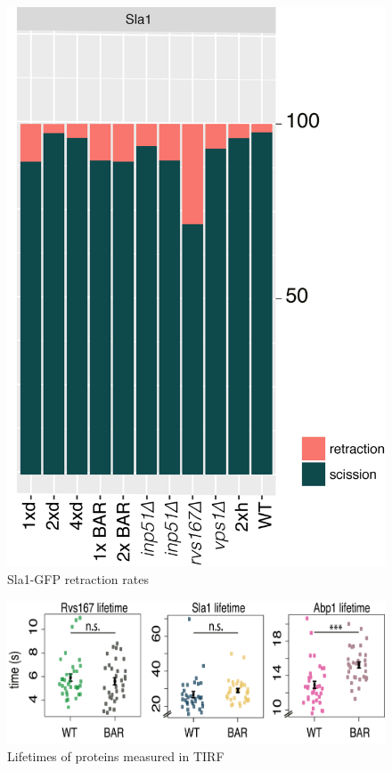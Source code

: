 \label{Ch:Appendix}

\begin{figure}[H]
\includegraphics[scale=1.5]{figures/appendix/retraction_rates_all}
\caption{Sla1-GFP retraction rates}
\end{figure}


\begin{figure}[H]
	\includegraphics[scale=0.6]{figures/appendix/delsh3_5}
	\caption{Lifetimes of proteins measured in TIRF}
\end{figure}
